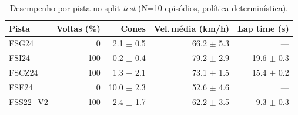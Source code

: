 \begin{table}[H]
\centering
\caption{Desempenho por pista no split \textit{test} (N=10 episódios, política determinística).}
\label{tab:per_track_test}
\begin{tabular}{lrrrr}
\toprule
\textbf{Pista} & \textbf{Voltas (\%)} & \textbf{Cones} & \textbf{Vel.\,m\'edia (km/h)} & \textbf{Lap time (s)} \\
\midrule
FSG24 & 0 & 2.1 $\pm$ 0.5 & 66.2 $\pm$ 5.3 & --- \\
FSI24 & 100 & 0.2 $\pm$ 0.4 & 79.2 $\pm$ 2.9 & 19.6 $\pm$ 0.3 \\
FSCZ24 & 100 & 1.3 $\pm$ 2.1 & 73.1 $\pm$ 1.5 & 15.4 $\pm$ 0.2 \\
FSE24 & 0 & 10.0 $\pm$ 2.3 & 52.6 $\pm$ 4.6 & --- \\
FSS22_V2 & 100 & 2.4 $\pm$ 1.7 & 62.2 $\pm$ 3.5 & 9.3 $\pm$ 0.3 \\
\bottomrule
\end{tabular}
\end{table}
